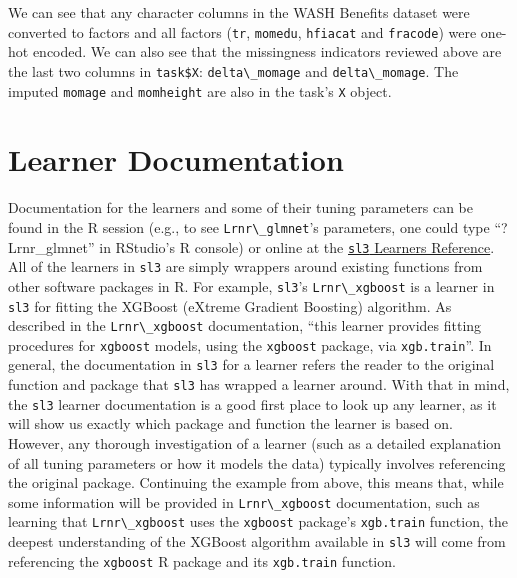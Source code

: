 \documentclass[
  12pt, krantz2,
]{krantz}
\newcommand{\passthrough}[1]{#1}
\newcommand{\1}{\mathbbm{1}}
\theoremstyle{definition}
\theoremstyle{definition}
\theoremstyle{definition}
\theoremstyle{definition}
\theoremstyle{remark}
\begin{document}
We can see that any character columns in the WASH Benefits dataset were
converted to factors and all factors (\passthrough{\lstinline!tr!}, \passthrough{\lstinline!momedu!}, \passthrough{\lstinline!hfiacat!} and \passthrough{\lstinline!fracode!})
were one-hot encoded. We can also see that the missingness indicators reviewed
above are the last two columns in \passthrough{\lstinline!task$X!}: \passthrough{\lstinline!delta\_momage!} and \passthrough{\lstinline!delta\_momage!}.
The imputed \passthrough{\lstinline!momage!} and \passthrough{\lstinline!momheight!} are also in the task's \passthrough{\lstinline!X!} object.

\hypertarget{learner-documentation}{%
\section{Learner Documentation}\label{learner-documentation}}

Documentation for the learners and some of their tuning parameters can be found
in the R session (e.g., to see \passthrough{\lstinline!Lrnr\_glmnet!}'s parameters, one could type
``?Lrnr\_glmnet'' in RStudio's R console) or online at the \href{https://tlverse.org/sl3/reference/index.html\#section-sl-learners}{\passthrough{\lstinline!sl3!} Learners
Reference}.
All of the learners in \passthrough{\lstinline!sl3!} are simply wrappers around existing functions from
other software packages in R. For example, \passthrough{\lstinline!sl3!}'s \passthrough{\lstinline!Lrnr\_xgboost!} is a learner
in \passthrough{\lstinline!sl3!} for fitting the XGBoost (eXtreme Gradient Boosting) algorithm. As
described in the \passthrough{\lstinline!Lrnr\_xgboost!} documentation, ``this learner provides fitting
procedures for \passthrough{\lstinline!xgboost!} models, using the \passthrough{\lstinline!xgboost!} package, via \passthrough{\lstinline!xgb.train!}''.
In general, the documentation in \passthrough{\lstinline!sl3!} for a learner refers the reader to the
original function and package that \passthrough{\lstinline!sl3!} has wrapped a learner around. With
that in mind, the \passthrough{\lstinline!sl3!} learner documentation is a good first place to look up
any learner, as it will show us exactly which package and function the learner
is based on. However, any thorough investigation of a learner (such as a
detailed explanation of all tuning parameters or how it models the data)
typically involves referencing the original package. Continuing the
example from above, this means that, while some information will be provided in
\passthrough{\lstinline!Lrnr\_xgboost!} documentation, such as learning that \passthrough{\lstinline!Lrnr\_xgboost!} uses the
\passthrough{\lstinline!xgboost!} package's \passthrough{\lstinline!xgb.train!} function, the deepest understanding of the
XGBoost algorithm available in \passthrough{\lstinline!sl3!} will come from referencing the \passthrough{\lstinline!xgboost!}
R package and its \passthrough{\lstinline!xgb.train!} function.
\end{document}
